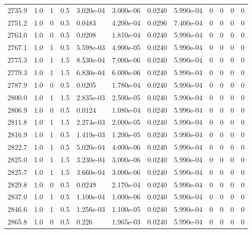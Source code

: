 \documentclass[preview]{standalone}
\begin{document}
{{{{{{{{{{{{\begin{tabular}{L{1.2cm}C{1.2cm} C{0.3cm}C{0.5cm} C{1.4cm}C{1.4cm} C{1.4cm}C{1.4cm} C{1.6cm}C{1.6cm} C{1.6cm}C{1.6cm}}
  2735.9  &   1.0  & 1     & 0.5 &  3.020e-04  & 3.000e-06  &  0.0240&   5.990e-04& 0 & 0   &  0 & 0  \\ 
  2751.2  &   1.0  & 0     & 0.5 &  0.0483  & 4.200e-04  &  0.0296&   7.400e-04& 0 & 0   &  0 & 0  \\ 
  2763.0  &   1.0  & 0     & 0.5 &  0.0208  & 1.810e-04  &  0.0240&   5.990e-04& 0 & 0   &  0 & 0  \\ 
  2767.1  &   1.0  & 1     & 0.5 &  5.598e-03  & 4.900e-05  &  0.0240&   5.990e-04& 0 & 0   &  0 & 0  \\ 
  2775.3  &   1.0  & 1     & 1.5 &  8.530e-04  & 7.000e-06  &  0.0240&   5.990e-04& 0 & 0   &  0 & 0  \\ 
  2779.3  &   1.0  & 1     & 1.5 &  6.830e-04  & 6.000e-06  &  0.0240&   5.990e-04& 0 & 0   &  0 & 0  \\ 
  2787.9  &   1.0  & 0     & 0.5 &  0.0205  & 1.780e-04  &  0.0240&   5.990e-04& 0 & 0   &  0 & 0  \\ 
  2800.0  &   1.0  & 1     & 1.5 &  2.835e-03  & 2.500e-05  &  0.0240&   5.990e-04& 0 & 0   &  0 & 0  \\ 
  2806.9  &   1.0  & 0     & 0.5 &  0.0124  & 1.080e-04  &  0.0240&   5.990e-04& 0 & 0   &  0 & 0  \\ 
  2811.8  &   1.0  & 1     & 1.5 &  2.274e-03  & 2.000e-05  &  0.0240&   5.990e-04& 0 & 0   &  0 & 0  \\ 
  2816.9  &   1.0  & 1     & 0.5 &  1.419e-03  & 1.200e-05  &  0.0240&   5.990e-04& 0 & 0   &  0 & 0  \\ 
  2822.7  &   1.0  & 1     & 0.5 &  5.020e-04  & 4.000e-06  &  0.0240&   5.990e-04& 0 & 0   &  0 & 0  \\ 
  2825.0  &   1.0  & 1     & 1.5 &  3.230e-04  & 3.000e-06  &  0.0240&   5.990e-04& 0 & 0   &  0 & 0  \\ 
  2825.7  &   1.0  & 1     & 1.5 &  3.660e-04  & 3.000e-06  &  0.0240&   5.990e-04& 0 & 0   &  0 & 0  \\ 
  2829.8  &   1.0  & 0     & 0.5 &  0.0249  & 2.170e-04  &  0.0240&   5.990e-04& 0 & 0   &  0 & 0  \\ 
  2837.0  &   1.0  & 1     & 0.5 &  1.100e-04  & 1.000e-06  &  0.0240&   5.990e-04& 0 & 0   &  0 & 0  \\ 
  2846.6  &   1.0  & 1     & 0.5 &  1.256e-03  & 1.100e-05  &  0.0240&   5.990e-04& 0 & 0   &  0 & 0  \\ 
  2865.8  &   1.0  & 0     & 0.5 &  0.226  & 1.965e-03  &  0.0240&   5.990e-04& 0 & 0   &  0 & 0  \\ 

\end{tabular}}}}}}}}}}}}}
\end{document}
